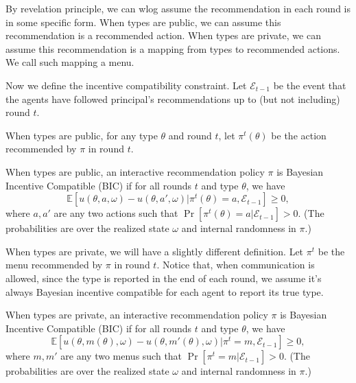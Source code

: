 \documentclass[11pt]{article}
\def\E{\mathbb{E}}
\def\EE{\mathcal{E}}
\begin{document}
By revelation principle, we can wlog assume the recommendation in each round is in some specific form. When types are public, we can assume this recommendation is a recommended action. When types are private, we can assume this recommendation is a mapping from types to recommended actions. We call such mapping a menu.

Now we define the incentive compatibility constraint. Let $\EE_{t-1}$ be the event that the agents have followed principal's recommendations up to (but not including) round $t$. 

When types are public, for any type $\theta$ and round $t$, let $\pi^t(\theta)$ be the action recommended by $\pi$ in round $t$. 
\begin{definition}
When types are public, an interactive recommendation policy $\pi$ is Bayesian Incentive Compatible (BIC) if for all rounds $t$ and type $\theta$, we have
\[
\E[ u(\theta,a,\omega) - u(\theta,a',\omega)| \pi^t(\theta) =a, \EE_{t-1}] \geq 0,
\]
where $a,a'$ are any two actions such that $\Pr[\pi^t(\theta) = a|\EE_{t-1}] > 0$. (The probabilities are over the realized state $\omega$ and internal randomness in $\pi$.)
\end{definition}

When types are private, we will have a slightly different definition. Let $\pi^t$ be the menu recommended by $\pi$  in round $t$. Notice that, when communication is allowed, since the type is reported in the end of each round, we assume it's always Bayesian incentive compatible for each agent to report its true type.  
\begin{definition}
When types are private, an interactive recommendation policy $\pi$ is Bayesian Incentive Compatible (BIC) if for all rounds $t$ and type $\theta$, we have
\[
\E[ u(\theta,m(\theta),\omega) - u(\theta,m'(\theta),\omega)| \pi^t = m, \EE_{t-1}] \geq 0,
\]
where $m,m'$ are any two menus such that $\Pr[\pi^t= m|\EE_{t-1}] > 0$. (The probabilities are over the realized state $\omega$ and internal randomness in $\pi$.)
\end{definition}











\appendix

\end{document}

